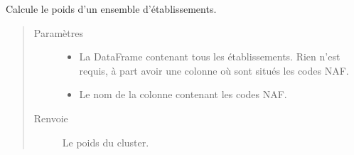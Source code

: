 \documentclass[letterpaper,10pt,french]{sphinxmanual}
\begin{document}
\begin{fulllineitems}
\label{\detokenize{index:src.clusterizer.utils.clusterizer_utils.calculer_poids_cluster}}
\sphinxAtStartPar
Calcule le poids d’un ensemble d’établissements.
\begin{quote}\begin{description}
\item[{Paramètres}] \leavevmode\begin{itemize}
\item {} 
\sphinxAtStartPar
{} \textendash{} La DataFrame contenant tous les établissements.
Rien n’est requis, à part avoir une colonne où sont situés les codes NAF.

\item {} 
\sphinxAtStartPar
{} \textendash{} Le nom de la colonne contenant les codes NAF.

\end{itemize}

\item[{Renvoie}] \leavevmode
\sphinxAtStartPar
Le poids du cluster.

\end{description}\end{quote}

\end{fulllineitems}

\end{document}
